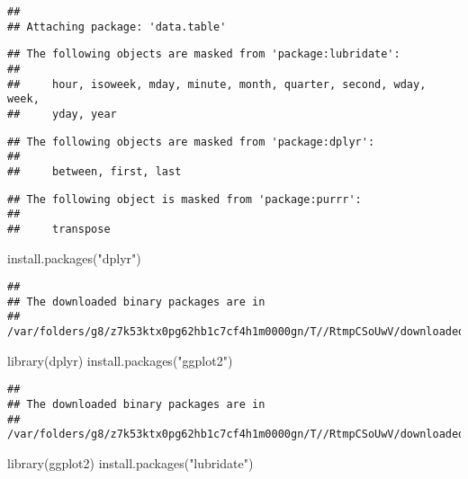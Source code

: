 \documentclass[
]{article}
\newenvironment{Shaded}{\begin{snugshade}}{\end{snugshade}}
\newcommand{\FunctionTok}[1]{\textcolor[rgb]{0.00,0.00,0.00}{#1}}
\newcommand{\NormalTok}[1]{#1}
\newcommand{\StringTok}[1]{\textcolor[rgb]{0.31,0.60,0.02}{#1}}
\begin{document}
\begin{verbatim}
## 
## Attaching package: 'data.table'
\end{verbatim}

\begin{verbatim}
## The following objects are masked from 'package:lubridate':
## 
##     hour, isoweek, mday, minute, month, quarter, second, wday, week,
##     yday, year
\end{verbatim}

\begin{verbatim}
## The following objects are masked from 'package:dplyr':
## 
##     between, first, last
\end{verbatim}

\begin{verbatim}
## The following object is masked from 'package:purrr':
## 
##     transpose
\end{verbatim}

\begin{Shaded}
\begin{Highlighting}[]
\FunctionTok{install.packages}\NormalTok{(}\StringTok{"dplyr"}\NormalTok{)}
\end{Highlighting}
\end{Shaded}

\begin{verbatim}
## 
## The downloaded binary packages are in
##  /var/folders/g8/z7k53ktx0pg62hb1c7cf4h1m0000gn/T//RtmpCSoUwV/downloaded_packages
\end{verbatim}

\begin{Shaded}
\begin{Highlighting}[]
\FunctionTok{library}\NormalTok{(dplyr)}
\FunctionTok{install.packages}\NormalTok{(}\StringTok{"ggplot2"}\NormalTok{)}
\end{Highlighting}
\end{Shaded}

\begin{verbatim}
## 
## The downloaded binary packages are in
##  /var/folders/g8/z7k53ktx0pg62hb1c7cf4h1m0000gn/T//RtmpCSoUwV/downloaded_packages
\end{verbatim}

\begin{Shaded}
\begin{Highlighting}[]
\FunctionTok{library}\NormalTok{(ggplot2)}
\FunctionTok{install.packages}\NormalTok{(}\StringTok{"lubridate"}\NormalTok{)}
\end{Highlighting}
\end{Shaded}
\end{document}
